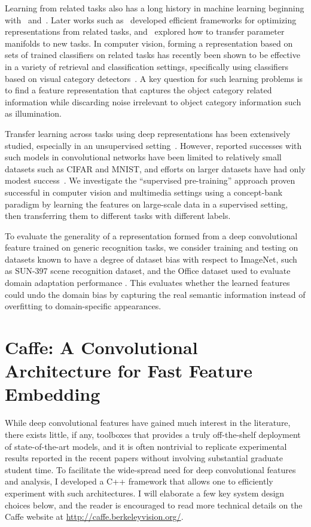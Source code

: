 Learning from related tasks also has a long history in machine learning beginning with~\cite{caruana1997multitask} and~\cite{thrun1996learning}. Later works such as~\cite{argyriou2008convex} developed efficient frameworks for optimizing representations from related tasks, and~\cite{ando2005framework} explored how to transfer parameter manifolds to new tasks. In computer vision, forming a representation based on sets of trained classifiers on related tasks has recently been shown to be effective in a variety of retrieval and classification settings, specifically using classifiers based on visual category detectors~\cite{torresani2010efficient,li2010object}. A key question for such learning problems is to find a feature representation that captures the object category related information while discarding noise irrelevant to object category information such as illumination.

Transfer  learning across tasks using deep representations has been extensively studied, especially in an unsupervised setting~\cite{raina2007self,mesnil2012unsupervised}. However, reported successes with such models in convolutional networks have been limited to relatively small datasets such as CIFAR and MNIST, and efforts on larger datasets have had only modest success~\cite{le2012icml}.  We investigate the ``supervised pre-training'' approach proven successful in computer vision and multimedia settings using a concept-bank paradigm \cite{lscom,li2010object,torresani2010efficient} by learning the features on large-scale data in a supervised setting, then transferring them to different tasks with different labels.

To evaluate the generality of a representation formed from a deep convolutional feature trained on generic recognition tasks, we consider training and testing on datasets known to have a degree of dataset bias with respect to ImageNet, such as SUN-397 scene recognition dataset, and the Office dataset used to evaluate domain adaptation performance \cite{ref:dlid,kulis2011you}. This evaluates whether the learned features could undo the domain bias by capturing the real semantic information instead of overfitting to domain-specific appearances.

\section{Caffe: A Convolutional Architecture for Fast Feature Embedding}
While deep convolutional features have gained much interest in the literature, there exists little, if any, toolboxes that provides a truly off-the-shelf deployment of state-of-the-art models, and it is often nontrivial to replicate experimental results reported in the recent papers without involving substantial graduate student time. To facilitate the wide-spread need for deep convolutional features and analysis, I developed a C++ framework that allows one to efficiently experiment with such architectures. I will elaborate a few key system design choices below, and the reader is encouraged to read more technical details on the Caffe website at \url{http://caffe.berkeleyvision.org/}.

